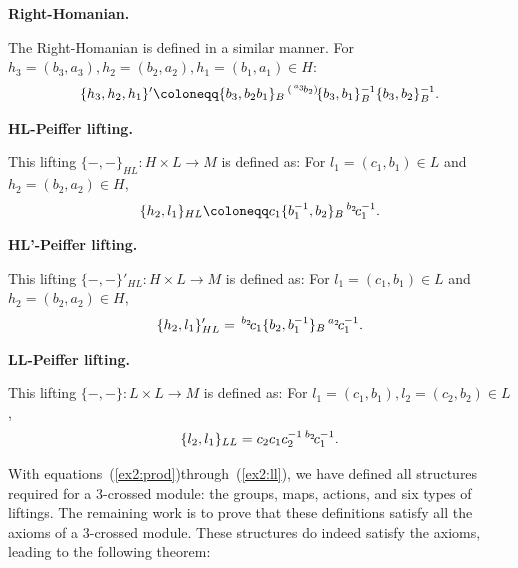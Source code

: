 \documentclass{tac}
\newcommand{\act}[1]{\,\sp{#1}\!}
\renewcommand{\to}{\rightarrow}
\begin{document}
\textbf{Right-Homanian.}

 The Right-Homanian is defined in a similar manner. For $h_3 = (b_3, a_3), h_2 = (b_2, a_2), h_1 = (b_1, a_1) \in H$:
\begin{align}
\label{ex_rhmn}
\{h_3,h_2,h_1\}' \coloneqq \{b_3,b_2b_1\}_B\act{(\act{a_3}b_2)}\{b_3,b_1\}_B^{-1}\{b_3,b_2\}_B^{-1}.
\end{align}


\textbf{HL-Peiffer lifting.}

This lifting $\{-,-\}_{HL} : H \times L \to M$ is defined as:
For $l_1 = (c_1, b_1) \in L$ and $h_2 = (b_2, a_2) \in H$,
\begin{align}
\{h_2,l_1\}_{HL} \coloneqq c_1\{b_1^{-1},b_2\}_B\act{b_2}c_1^{-1}.
\end{align}


\textbf{HL'-Peiffer lifting.}

This lifting $\{-,-\}'_{HL} : H \times L \to M$ is defined as:
For $l_1 = (c_1, b_1) \in L$ and $h_2 = (b_2, a_2) \in H$,
\begin{align}
\{h_2,l_1\}'_{HL} = \act{b_2}c_1\{b_2,b_1^{-1}\}_B\act{a_2}c_1^{-1}.
\end{align}


\textbf{LL-Peiffer lifting.}

This lifting $\{-,-\} : L \times L \to M$ is defined as:
For $l_1 = (c_1, b_1), l_2 = (c_2, b_2)  \in L$,
\begin{align}
\label{ex2:ll}
\{l_2,l_1\}_{LL} = c_2 c_1 c_2^{-1}\act{b_2}c_1^{-1}.
\end{align}

With equations~(\ref{ex2:prod})through~(\ref{ex2:ll}), we have defined all structures required for a 3-crossed module: the groups, maps, actions, and six types of liftings. The remaining work is to prove that these definitions satisfy all the axioms of a 3-crossed module. These structures do indeed satisfy the axioms, leading to the following theorem:
\end{document}
